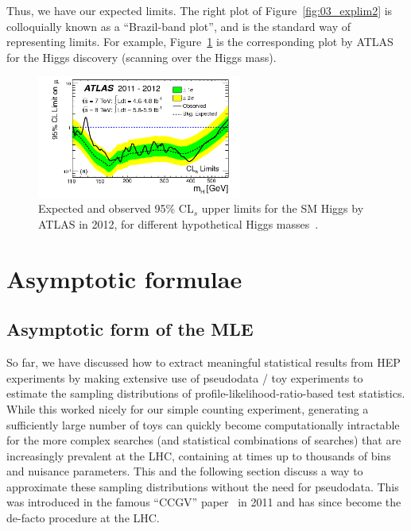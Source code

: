 Thus, we have our expected limits. 
The right plot of Figure~\ref{fig:03_explim2} is colloquially known as a ``Brazil-band plot'', and is the standard way of representing limits. 
For example, Figure~\ref{fig:03_atlas_higgs} is the corresponding plot by ATLAS for the Higgs discovery (scanning over the Higgs mass).

\begin{figure}[htb]
\centering
\includegraphics[width=0.6\textwidth]{figures/03-Stats/04-expected/atlas_limits.png}
\caption{Expected and observed 95\% CL$_s$ upper limits for the SM Higgs by ATLAS in 2012, for different hypothetical Higgs masses~\cite{ATLAS:2012yve}.}
\label{fig:03_atlas_higgs}
\end{figure}


\section{Asymptotic formulae}
\label{sec:03_asymptotic}

\subsection{Asymptotic form of the MLE}
\label{sec:03_asymptotic_mle}

So far, we have discussed how to extract meaningful statistical results from HEP experiments by making extensive use of pseudodata / toy experiments to estimate the sampling distributions of profile-likelihood-ratio-based test statistics.
While this worked nicely for our simple counting experiment, generating a sufficiently large number of toys can quickly become computationally intractable for the more complex searches (and statistical combinations of searches) that are increasingly prevalent at the LHC, containing at times up to thousands of bins and nuisance parameters.
This and the following section discuss a way to approximate these sampling distributions without the need for pseudodata.
This was introduced in the famous ``CCGV'' paper~\cite{Cowan:2010js} in 2011 and has since become the de-facto procedure at the LHC.


